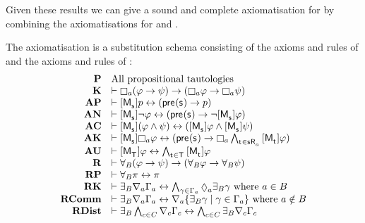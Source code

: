 Given these results we can give a sound and complete axiomatisation for \logicRamlK{} by combining the axiomatisations for \logicAmlK{} and \logicRmlK{}.

\pagebreak

\begin{definition}\label{raml-k-axiomatisation}
The axiomatisation \axiomRamlK{} is a substitution schema consisting of the axioms and rules of \axiomAmlK{} and the axioms and rules of \axiomRmlK{}:
$$
\begin{array}{rl}
    {\bf P}     & \text{All propositional tautologies}\\
    {\bf K}     & \proves \necessaryA (\phi \implies \psi) \implies (\necessaryA \phi \implies \necessaryA \psi)\\
    {\bf AP} & \proves \actionA{\aPModel{\aStateS}} \atomP \iff (\aPrecondition(\aStateS) \implies \atomP)\\
    {\bf AN} & \proves \actionA{\aPModel{\aStateS}} \lnot \phi \iff (\aPrecondition(\aStateS) \implies \lnot \actionA{\aPModel{\aStateS}} \phi)\\
    {\bf AC} & \proves \actionA{\aPModel{\aStateS}} (\phi \land \psi) \iff (\actionA{\aPModel{\aStateS}} \phi \land \actionA{\aPModel{\aStateS}} \psi)\\
    {\bf AK} & \proves \actionA{\aPModel{\aStateS}} \necessaryA \phi \iff (\aPrecondition(\aStateS) \implies \necessaryA \bigwedge_{\aStateT \in \aSuccessorsA{\aStateS}} \actionA{\aPModel{\aStateT}} \phi)\\
    {\bf AU} & \proves \actionA{\aPModel{\aStatesT}} \phi \iff \bigwedge_{\aStateT \in \aStatesT} \actionA{\aPModel{\aStateT}} \phi\\
    {\bf R} & \proves \allrefsBs (\phi \implies \psi) \implies (\allrefsBs \phi \implies \allrefsBs \psi)\\
    {\bf RP} & \proves \allrefsBs \pi \iff \pi\\
    {\bf RK} & \proves \somerefsBs \coversA \Gamma_\agentA \iff \bigwedge_{\gamma \in \Gamma_\agentA} \possibleA \somerefsBs \gamma \text{ where } \agentA \in \agentsB\\
    {\bf RComm} & \proves \somerefsBs \coversA \Gamma_\agentA \iff \coversA \{\somerefsBs \gamma \mid \gamma \in \Gamma_\agentA\} \text{ where } \agentA \notin \agentsB\\
    {\bf RDist} & \proves \somerefsBs \bigwedge_{\agentC \in \agentsC} \coversC \Gamma_\agentC \iff \bigwedge_{\agentC \in \agentsC} \somerefsBs \coversC \Gamma_\agentC\\

\end{array}$$
\end{definition}

